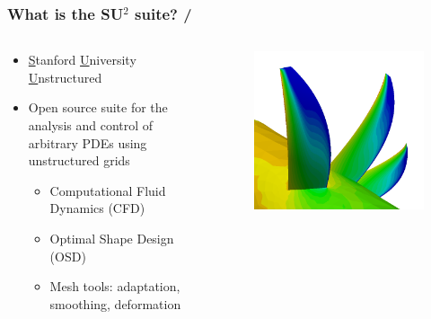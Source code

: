 \documentclass[handout,table]{beamer}
\begin{document}
\begin{frame}[t]
\frametitle{What is the SU$^2$ suite? \hfill  \small{ \insertframenumber/\inserttotalframenumber} }

\begin{columns} 
  \begin{column}{.7\textwidth}
\begin{itemize}
\item \textcolor{cardinal}{\underline S}tanford \textcolor{cardinal}{\underline U}niversity \textcolor{cardinal}{\underline U}nstructured

\pause

\item \textcolor{cardinal}{Open source suite for the analysis and control of arbitrary PDEs} using unstructured grids
\begin{itemize}
\item Computational Fluid Dynamics (CFD)
\item Optimal Shape Design (OSD)
\item Mesh tools: adaptation, smoothing, deformation
\end{itemize}
\end{itemize}
  \end{column}
  \begin{column}{.3\textwidth}
\begin{figure}
\begin{center}
\includegraphics[width=1.0\textwidth]{rotor_closeup.png}
\label{wedge_mesh}
\end{center}
\end{figure}
  \end{column}
\end{columns}


\end{frame}
\end{document}
